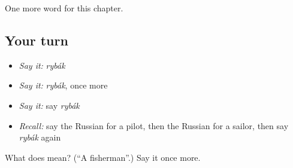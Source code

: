\begin{grammarlens}[title={What you've built}]
One more word for this chapter.
\end{grammarlens}

\subsection*{Your turn}
\begin{itemize}
\raggedright
  \item \emph{Say it:} \emph{rybák}
  \item \emph{Say it:} \emph{rybák}, once more
  \item \emph{Say it:} say \emph{rybák}
  \item \emph{Recall:} say the Russian for a pilot, then the Russian for a sailor, then say \emph{rybák} again
\end{itemize}

\begin{tcolorbox}[breakable,colback=teal!4,colframe=teal!35!black,title={Before you move on}]
What does  mean? (\textquotedblleft{}A fisherman\textquotedblright{}.) Say it once more.
\end{tcolorbox}
